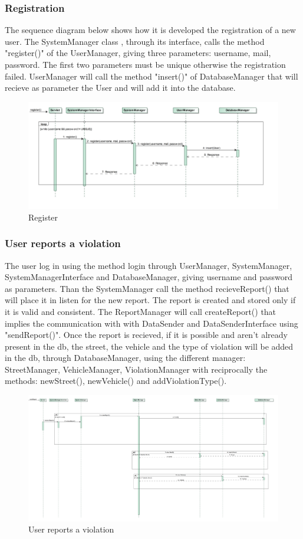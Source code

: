 \subsubsection{Registration}
The sequence diagram below shows how it is developed the registration of a new user. The SystemManager class , through its interface, calls  the method "register()" of the UserManager, giving three parameters: username, mail, password. The first two parameters must be unique otherwise the registration failed.
UserManager will call the method "insert()" of DatabaseManager that will recieve as parameter the User and will add it into the database.
\begin{figure}[H]
	\centering
	\includegraphics[width=0.97\linewidth, height=0.32\textheight]{Images/RunTimeDiagram/Sequence1}
	\caption{Register}
	\label{fig:Register}
\end{figure}
\subsubsection{User reports a violation}
The user log in using the method login through UserManager, SystemManager, SystemManagerInterface and DatabaseManager, giving username and password as parameters.
Than the SystemManager call the method recieveReport() that will place it in listen for the new report. The report is created and stored only if it is valid and consistent. The ReportManager will call createReport() that implies the communication with with DataSender and  DataSenderInterface using "sendReport()".
Once the report is recieved, if it is possible and aren't already present in the db, the street, the vehicle and the type of violation will be added in the db, through DatabaseManager, using the different manager: StreetManager, VehicleManager, ViolationManager with reciprocally the methods: newStreet(), newVehicle() and addViolationType().
\begin{figure}[H] 
	\centering
	\includegraphics[width=0.95\linewidth, height=0.7\textheight]{Images/RunTimeDiagram/Sequence2}
	\caption{User reports a violation}
	\label{fig:User reports a violation}
\end{figure}
